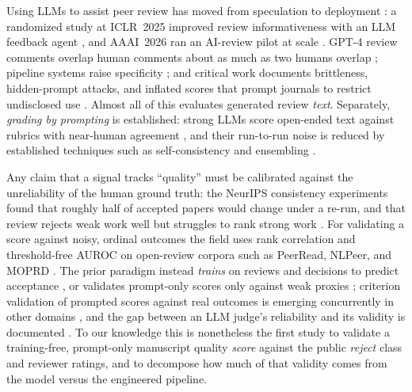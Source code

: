 \ifnmibuild
Using LLMs to assist peer review has moved from speculation to deployment
\citep{zhuang2025asprsurvey}: a randomized study at ICLR~2025 improved review informativeness
with an LLM feedback agent \citep{thakkar2026feedback}, and AAAI~2026 ran an AI-review pilot at
scale \citep{biswas2026aaai}. GPT-4 review comments overlap human comments about as much as two
humans overlap \citep{liang2024llm}; pipeline systems raise specificity \citep{darcy2024marg};
and critical work documents brittleness, hidden-prompt attacks, and inflated scores
\citep{lin2025hidden,russolatona2024lottery,zhu2025reviewer} that prompt journals to restrict
undisclosed use \citep{science2025funding}. Almost all of this evaluates generated review
\emph{text}. Separately, \emph{grading by prompting} is established: strong LLMs score open-ended
text against rubrics with near-human agreement \citep{zheng2023judging,liu2023geval}, and their
run-to-run noise is reduced by established techniques such as self-consistency and ensembling
\citep{wang2023selfconsistency}.

Any claim that a signal tracks ``quality'' must be calibrated against the unreliability of the
human ground truth: the NeurIPS consistency experiments found that roughly half of accepted
papers would change under a re-run, and that review rejects weak work well but struggles to rank
strong work \citep{cortes2021inconsistency,beygelzimer2023arbitrary}. For validating a score
against noisy, ordinal outcomes the field uses rank correlation and threshold-free AUROC on
open-review corpora such as PeerRead, NLPeer, and MOPRD
\citep{kang2018peerread,dycke2023nlpeer,lin2023moprd}. The prior paradigm instead \emph{trains}
on reviews and decisions to predict acceptance \citep{kang2018peerread}, or validates prompt-only
scores only against weak proxies \citep{thelwall2024chatgpt}; criterion validation of prompted
scores against real outcomes is emerging concurrently in other domains \citep{chen2026criterion},
and the gap between an LLM judge's reliability and its validity is documented
\citep{norman2026reliability}. To our knowledge this is nonetheless the first study to validate a
training-free, prompt-only manuscript quality \emph{score} against the public \emph{reject} class
and reviewer ratings, and to decompose how much of that validity comes from the model versus the
engineered pipeline.
\else
